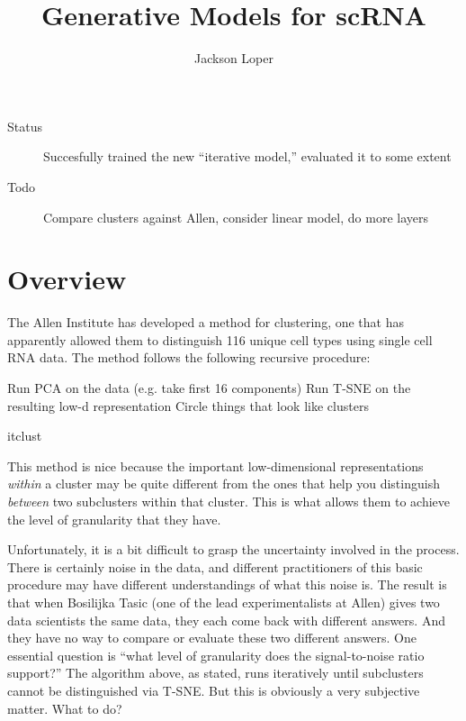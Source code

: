 



\DeclareMathOperator*{\Categorical}{Categorical}


\title{Generative Models for scRNA}
\author{Jackson Loper}

\usepackage{amsthm}
\newtheorem{thm}{Theorem}
\newtheorem{conj}{Conjecture}


\maketitle

\begin{description}
  \item[Status] Succesfully trained the new ``iterative model,'' evaluated it to some extent
  \item[Todo] Compare clusters against Allen, consider linear model, do more layers
\end{description}

\section{Overview}

The Allen Institute has developed a method for clustering, one that has apparently allowed them to distinguish 116 unique cell types using single cell RNA data.  The method follows the following recursive procedure:

\begin{algorithm}[H]
 \vspace{.1in}
  Run PCA on the data (e.g. take first 16 components)\;
  Run T-SNE on the resulting low-d representation\;
  Circle things that look like clusters\;
 \caption{itclust}
\end{algorithm}

This method is nice because the important low-dimensional representations \emph{within} a cluster may be quite different from the ones that help you distinguish \emph{between} two subclusters within that cluster.  This is what allows them to achieve the level of granularity that they have. 

Unfortunately, it is a bit difficult to grasp the uncertainty involved in the process.  There is certainly noise in the data, and different practitioners of this basic procedure may have different understandings of what this noise is.  The result is that when Bosilijka Tasic (one of the lead experimentalists at Allen) gives two data scientists the same data, they each come back with different answers.  And they have no way to compare or evaluate these two different answers.  One essential question is ``what level of granularity does the signal-to-noise ratio support?''  The algorithm above, as stated, runs iteratively until subclusters cannot be distinguished via T-SNE.  But this is obviously a very subjective matter.  What to do?

